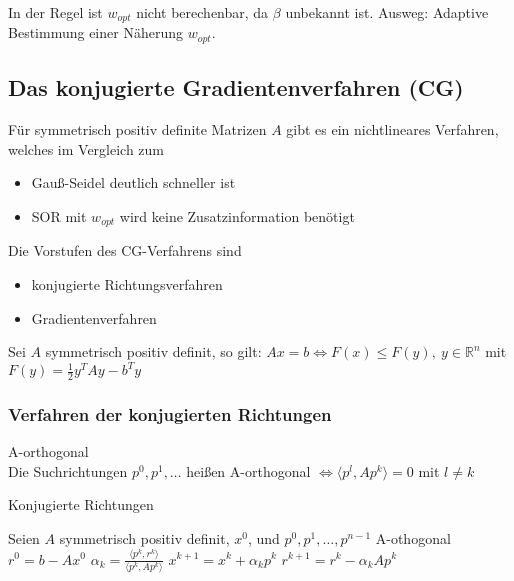 \begin{remark}
	In der Regel ist $w_{opt}$ nicht berechenbar, da $\beta$ unbekannt ist. Ausweg: Adaptive Bestimmung einer Näherung $w_{opt}$.
\end{remark}

\subsection{Das konjugierte Gradientenverfahren (CG)}
Für symmetrisch positiv definite Matrizen $A$ gibt es ein nichtlineares Verfahren, welches im Vergleich zum
\begin{itemize}
	\item Gauß-Seidel deutlich schneller ist
	\item SOR mit $w_{opt}$ wird keine Zusatzinformation benötigt
\end{itemize}
Die Vorstufen des CG-Verfahrens sind
\begin{itemize}
	\item konjugierte Richtungsverfahren
	\item Gradientenverfahren
\end{itemize}

\begin{theorem}
	Sei $A$ symmetrisch positiv definit, so gilt: $Ax=b \Leftrightarrow F(x)\leq F(y),\ y\in \mathbb{R}^{n}$ 
	mit $F(y)=\frac{1}{2}y^{T}Ay-b^{T}y$
\end{theorem}

\subsubsection{Verfahren der konjugierten Richtungen}
\begin{definition}
	 A-orthogonal
	\\
	Die Suchrichtungen $p^{0},p^{1},\ldots$ heißen A-orthogonal $\Leftrightarrow \langle p^{l},Ap^{k}\rangle=0$ mit $l\not = k$
\end{definition}

\begin{algorithm}
	\caption{Konjugierte Richtungen}
	\begin{algorithmic}
		\STATE  Seien $A$ symmetrisch positiv definit, $x^{0}$, und $p^{0},p^{1},\ldots,p^{n-1}$ A-othogonal
		\STATE $r^{0}=b-Ax^{0}$
			\STATE $\alpha_{k} = \frac{\langle p^{k},r^{k}\rangle}{\langle p^{k},Ap^{k}\rangle}$
			\STATE $x^{k+1} = x^{k} + \alpha_{k}p^{k}$
			\STATE $r^{k+1} = r^{k} - \alpha_{k}Ap^{k}$
		\ENDFOR
	\end{algorithmic}
\end{algorithm}

